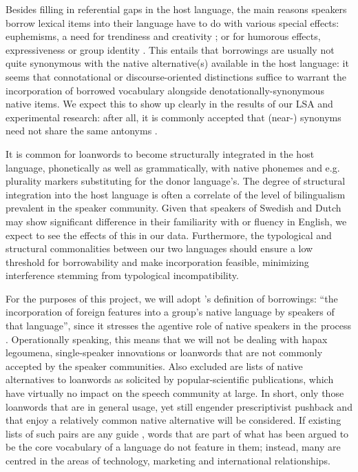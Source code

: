 \documentclass[a4paper]{article}
\begin{document}
Besides filling in referential gaps in the host language, the main reasons speakers borrow lexical items into their language have to do with various special effects: euphemisms, a need for trendiness and creativity \citep{Rebuck2002}; or for humorous effects, expressiveness or group identity \citep{Gottlieb2006,Wennberg2010}. 
This entails that borrowings are usually not quite synonymous with the native alternative(s) available in the host language: it seems that connotational or discourse-oriented distinctions suffice to warrant the incorporation of borrowed vocabulary alongside denotationally-synonymous native items. 
We expect this to show up clearly in the results of our LSA and experimental research: after all, it is commonly accepted that (near-) synonyms need not share the same antonyms \citep[cf.][]{Miller1990}. 

It is common for loanwords to become structurally integrated in the host language, phonetically as well as grammatically, with native phonemes and e.g. plurality markers substituting for the donor language's.
The degree of structural integration into the host language is often a correlate of the level of bilingualism prevalent in the speaker community.
Given that speakers of Swedish and Dutch may show significant difference in their familiarity with or fluency in English, we expect to see the effects of this in our data.
Furthermore, the typological and structural commonalities between our two languages should ensure a low threshold for borrowability and make incorporation feasible, minimizing interference stemming from typological incompatibility.

For the purposes of this project, we will adopt \citet[p.37]{Thomason1988}'s definition of borrowings: ``the incorporation of foreign features into a group's native language by speakers of that language'', since it stresses the agentive role of native speakers in the process \citep[see also][p.12]{Winford2003}. 
Operationally speaking, this means that we will not be dealing with hapax legoumena, single-speaker innovations or loanwords that are not commonly accepted by the speaker communities. 
Also excluded are lists of native alternatives to loanwords as solicited by popular-scientific publications, which have virtually no impact on the speech community at large. 
In short, only those loanwords that are in general usage, yet still engender prescriptivist pushback and that enjoy a relatively common native alternative will be considered. 
If existing lists of such pairs are any guide \citep[cf.][]{Koops2009,Universitet2012}, words that are part of what has been argued to be the core vocabulary of a language \citep[see][]{Swadesh1955} do not feature in them; instead, many are centred in the areas of technology, marketing and international relationships. 
\end{document}
